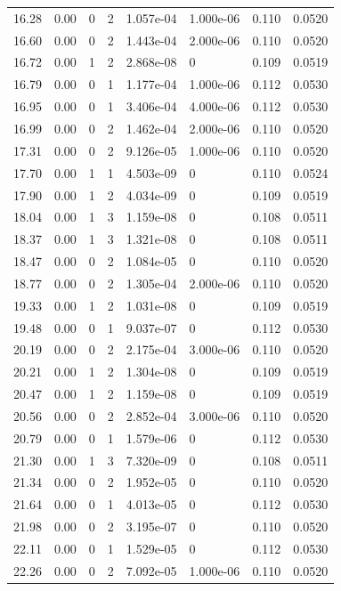 \documentclass[preview]{standalone}
\begin{document}
{{{\begin{tabular}{L{1.2cm}C{1.2cm} C{0.3cm}C{0.5cm} C{1.4cm}C{1.4cm} C{1.4cm}C{1.4cm}}
  16.28  &  0.00  & 0     &  2 &  1.057e-04  & 1.000e-06  & 0.110 &  0.0520   \\ 
  16.60  &  0.00  & 0     &  2 &  1.443e-04  & 2.000e-06  & 0.110 &  0.0520   \\ 
  16.72  &  0.00  & 1     &  2 &  2.868e-08  & 0  & 0.109 &  0.0519   \\ 
  16.79  &  0.00  & 0     &  1 &  1.177e-04  & 1.000e-06  & 0.112 &  0.0530   \\ 
  16.95  &  0.00  & 0     &  1 &  3.406e-04  & 4.000e-06  & 0.112 &  0.0530   \\ 
  16.99  &  0.00  & 0     &  2 &  1.462e-04  & 2.000e-06  & 0.110 &  0.0520   \\ 
  17.31  &  0.00  & 0     &  2 &  9.126e-05  & 1.000e-06  & 0.110 &  0.0520   \\ 
  17.70  &  0.00  & 1     &  1 &  4.503e-09  & 0  & 0.110 &  0.0524   \\ 
  17.90  &  0.00  & 1     &  2 &  4.034e-09  & 0  & 0.109 &  0.0519   \\ 
  18.04  &  0.00  & 1     &  3 &  1.159e-08  & 0  & 0.108 &  0.0511   \\ 
  18.37  &  0.00  & 1     &  3 &  1.321e-08  & 0  & 0.108 &  0.0511   \\ 
  18.47  &  0.00  & 0     &  2 &  1.084e-05  & 0  & 0.110 &  0.0520   \\ 
  18.77  &  0.00  & 0     &  2 &  1.305e-04  & 2.000e-06  & 0.110 &  0.0520   \\ 
  19.33  &  0.00  & 1     &  2 &  1.031e-08  & 0  & 0.109 &  0.0519   \\ 
  19.48  &  0.00  & 0     &  1 &  9.037e-07  & 0  & 0.112 &  0.0530   \\ 
  20.19  &  0.00  & 0     &  2 &  2.175e-04  & 3.000e-06  & 0.110 &  0.0520   \\ 
  20.21  &  0.00  & 1     &  2 &  1.304e-08  & 0  & 0.109 &  0.0519   \\ 
  20.47  &  0.00  & 1     &  2 &  1.159e-08  & 0  & 0.109 &  0.0519   \\ 
  20.56  &  0.00  & 0     &  2 &  2.852e-04  & 3.000e-06  & 0.110 &  0.0520   \\ 
  20.79  &  0.00  & 0     &  1 &  1.579e-06  & 0  & 0.112 &  0.0530   \\ 
  21.30  &  0.00  & 1     &  3 &  7.320e-09  & 0  & 0.108 &  0.0511   \\ 
  21.34  &  0.00  & 0     &  2 &  1.952e-05  & 0  & 0.110 &  0.0520   \\ 
  21.64  &  0.00  & 0     &  1 &  4.013e-05  & 0  & 0.112 &  0.0530   \\ 
  21.98  &  0.00  & 0     &  2 &  3.195e-07  & 0  & 0.110 &  0.0520   \\ 
  22.11  &  0.00  & 0     &  1 &  1.529e-05  & 0  & 0.112 &  0.0530   \\ 
  22.26  &  0.00  & 0     &  2 &  7.092e-05  & 1.000e-06  & 0.110 &  0.0520   \\ 
\hline 
\end{tabular} 

}}}
\end{document}
